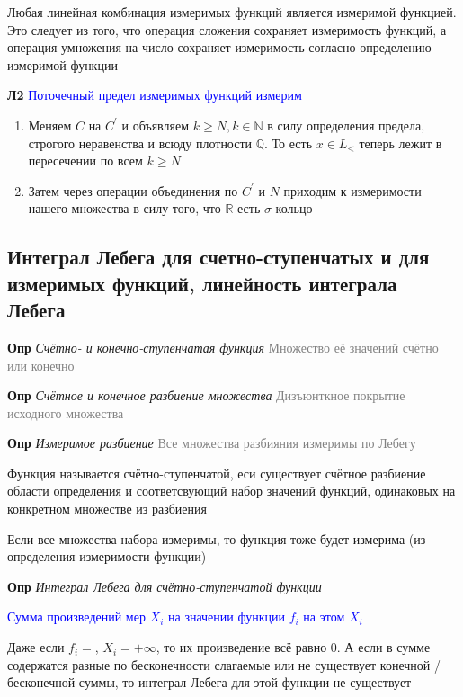 Любая линейная комбинация измеримых функций является измеримой функцией.
Это следует из того, что операция сложения сохраняет измеримость функций, а операция умножения на число сохраняет
измеримость согласно определению измеримой функции

\textbf{Л2} \textcolor{blue}{Поточечный предел измеримых функций измерим}

\begin{enumerate}
    \item Меняем $C$ на $C^{'}$ и объявляем $k \geq N, k \in \mathbb{N}$ в силу определения предела, строгого
    неравенства и всюду плотности $\mathbb{Q}$.
    То есть $x \in L_<$ теперь лежит в пересечении по всем $k \geq N$
    \item Затем через операции объединения по $C^{'}$ и $N$ приходим к измеримости нашего множества в силу того, что
    $\mathbb{R}$ есть $\sigma$-кольцо
\end{enumerate}

\subsection{Интеграл Лебега для счетно-ступенчатых и для измеримых функций, линейность интеграла Лебега}

\textbf{Опр} \textit{Счётно- и конечно-ступенчатая функция} \textcolor{gray}{Множество её значений счётно или
конечно}

\textbf{Опр} \textit{Счётное и конечное разбиение множества} \textcolor{gray}{Дизъюнткное покрытие
исходного множества}

\textbf{Опр} \textit{Измеримое разбиение} \textcolor{gray}{Все множества разбияния измеримы по Лебегу}

Функция называется счётно-ступенчатой, еси существует счётное разбиение области определения и соответсвующий
набор значений функций, одинаковых на конкретном множестве из разбиения

Если все множества набора измеримы, то функция тоже будет измерима (из определения измеримости функции)

\textbf{Опр} \textit{Интеграл Лебега для счётно-ступенчатой функции}

\textcolor{blue}{Сумма произведений мер $X_i$ на значении функции $f_i$ на этом $X_i$}

Даже если $f_i = $, $X_i = +\infty$, то их произведение всё равно 0.
А если в сумме содержатся разные по бесконечности слагаемые или не существует конечной / бесконечной суммы, то интеграл Лебега для этой функции не
существует

